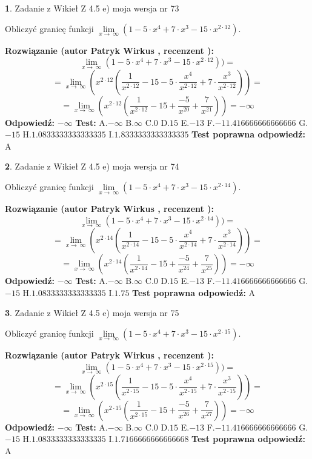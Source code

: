\documentclass[12pt, a4paper]{article}
\theoremstyle{definition} %
\newtheorem{zad}{}
\newcommand{\zadStart}[1]{\begin{zad}#1\newline}
\newcommand{\zadStop}{\end{zad}}
\newcommand{\rozwStart}[2]{\noindent \textbf{Rozwiązanie (autor #1 , recenzent #2): }\newline}
\newcommand{\rozwStop}{\newline}
\newcommand{\odpStart}{\noindent \textbf{Odpowiedź:}\newline}
\newcommand{\odpStop}{\newline}
\newcommand{\testStart}{\noindent \textbf{Test:}\newline}
\newcommand{\testStop}{\newline}
\newcommand{\kluczStart}{\noindent \textbf{Test poprawna odpowiedź:}\newline}
\newcommand{\kluczStop}{\newline}
\begin{document}
\zadStart{Zadanie z Wikieł Z 4.5 e) moja wersja nr 73}


Obliczyć granicę funkcji  $\lim\limits_{x\to\ \infty}(1 - 5 \cdot x^{4}+7 \cdot x^{3}- 15 \cdot x^{2\cdot12})$.
\zadStop
\rozwStart{Patryk Wirkus}{}
$$\lim\limits_{x\to\ \infty}(1 - 5 \cdot x^{4}+7 \cdot x^{3}- 15 \cdot x^{2\cdot12}))=$$
$$=\lim\limits_{x\to\ \infty}(x^{2\cdot12}(\frac{1}{x^{2\cdot12}}-15 -5 \cdot \frac{x^{4}}{x^{2\cdot12}}+7 \cdot \frac{x^{3}}{x^{2\cdot12}}))=$$
$$=\lim\limits_{x\to\ \infty}(x^{2\cdot12}(\frac{1}{x^{2\cdot12}}-15 + \frac{-5}{x^{20}}+ \frac{7}{x^{21}}))=-\infty$$
\rozwStop
\odpStart
$-\infty$
\odpStop
\testStart
A.$-\infty$ B.$\infty$ C.$0$ D.$15$ E.$-13$
F.$-11.416666666666666$ G.$-15$
H.$1.0833333333333335$
I.$1.8333333333333335$
\testStop
\kluczStart
A
\kluczStop



\zadStart{Zadanie z Wikieł Z 4.5 e) moja wersja nr 74}


Obliczyć granicę funkcji  $\lim\limits_{x\to\ \infty}(1 - 5 \cdot x^{4}+7 \cdot x^{3}- 15 \cdot x^{2\cdot14})$.
\zadStop
\rozwStart{Patryk Wirkus}{}
$$\lim\limits_{x\to\ \infty}(1 - 5 \cdot x^{4}+7 \cdot x^{3}- 15 \cdot x^{2\cdot14}))=$$
$$=\lim\limits_{x\to\ \infty}(x^{2\cdot14}(\frac{1}{x^{2\cdot14}}-15 -5 \cdot \frac{x^{4}}{x^{2\cdot14}}+7 \cdot \frac{x^{3}}{x^{2\cdot14}}))=$$
$$=\lim\limits_{x\to\ \infty}(x^{2\cdot14}(\frac{1}{x^{2\cdot14}}-15 + \frac{-5}{x^{24}}+ \frac{7}{x^{25}}))=-\infty$$
\rozwStop
\odpStart
$-\infty$
\odpStop
\testStart
A.$-\infty$ B.$\infty$ C.$0$ D.$15$ E.$-13$
F.$-11.416666666666666$ G.$-15$
H.$1.0833333333333335$
I.$1.75$
\testStop
\kluczStart
A
\kluczStop



\zadStart{Zadanie z Wikieł Z 4.5 e) moja wersja nr 75}


Obliczyć granicę funkcji  $\lim\limits_{x\to\ \infty}(1 - 5 \cdot x^{4}+7 \cdot x^{3}- 15 \cdot x^{2\cdot15})$.
\zadStop
\rozwStart{Patryk Wirkus}{}
$$\lim\limits_{x\to\ \infty}(1 - 5 \cdot x^{4}+7 \cdot x^{3}- 15 \cdot x^{2\cdot15}))=$$
$$=\lim\limits_{x\to\ \infty}(x^{2\cdot15}(\frac{1}{x^{2\cdot15}}-15 -5 \cdot \frac{x^{4}}{x^{2\cdot15}}+7 \cdot \frac{x^{3}}{x^{2\cdot15}}))=$$
$$=\lim\limits_{x\to\ \infty}(x^{2\cdot15}(\frac{1}{x^{2\cdot15}}-15 + \frac{-5}{x^{26}}+ \frac{7}{x^{27}}))=-\infty$$
\rozwStop
\odpStart
$-\infty$
\odpStop
\testStart
A.$-\infty$ B.$\infty$ C.$0$ D.$15$ E.$-13$
F.$-11.416666666666666$ G.$-15$
H.$1.0833333333333335$
I.$1.7166666666666668$
\testStop
\kluczStart
A
\kluczStop
\end{document}
